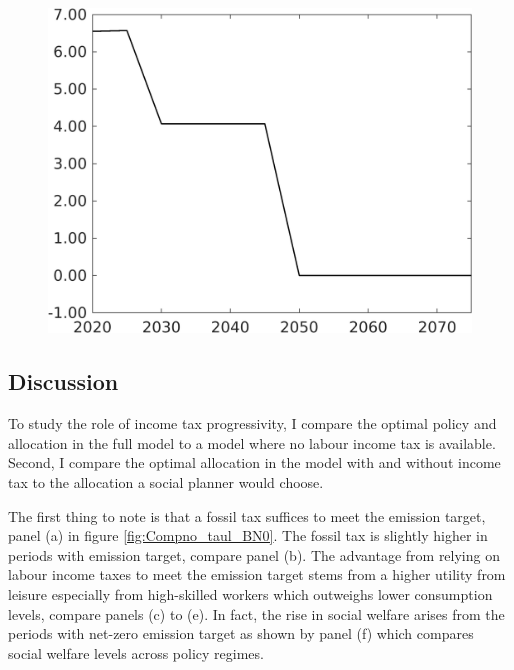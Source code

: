 \begin{figure}[h!!]
\begin{minipage}[]{0.32\textwidth}
\end{minipage}
\begin{minipage}[]{0.32\textwidth}
	\includegraphics[width=1\textwidth]{../../codding_model/own_basedOnFried/optimalPol_elastS_DisuSci/figures/all_1705/Single_OPT_T_NoTaus_Emnet_spillover0_sep1_BN0_ineq0_etaa0.79.png}
\end{minipage}
\end{figure} 

\subsection{Discussion}
To study the role of income tax progressivity, I compare the optimal policy and allocation in the full model to a  model where no labour income tax is available. Second, I compare the optimal allocation in the model with and without income tax to the allocation a social planner would choose.

The first thing to note is that a fossil tax suffices to meet the emission target, panel (a) in figure \ref{fig:Compno_taul_BN0}. The fossil tax is slightly higher in periods with emission target, compare panel (b).
The advantage from relying on labour income taxes to meet the emission target stems from a higher utility from leisure especially from high-skilled workers which outweighs lower consumption levels, compare panels (c) to (e). In fact, the rise in social welfare arises from the periods with net-zero emission target as shown by panel (f) which compares social welfare levels across policy regimes. 

